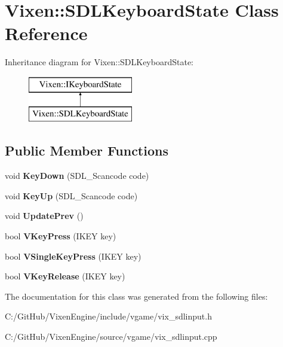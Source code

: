 \hypertarget{class_vixen_1_1_s_d_l_keyboard_state}{}\section{Vixen\+:\+:S\+D\+L\+Keyboard\+State Class Reference}
\label{class_vixen_1_1_s_d_l_keyboard_state}
Inheritance diagram for Vixen\+:\+:S\+D\+L\+Keyboard\+State\+:\begin{figure}[H]
\begin{center}
\leavevmode
\includegraphics[height=2.000000cm]{class_vixen_1_1_s_d_l_keyboard_state}
\end{center}
\end{figure}
\subsection*{Public Member Functions}
\begin{DoxyCompactItemize}
\item 
\hypertarget{class_vixen_1_1_s_d_l_keyboard_state_a21a6e4ff37104cf887b544ba4248c2f7}{}void {\bfseries Key\+Down} (S\+D\+L\+\_\+\+Scancode code)\label{class_vixen_1_1_s_d_l_keyboard_state_a21a6e4ff37104cf887b544ba4248c2f7}

\item 
\hypertarget{class_vixen_1_1_s_d_l_keyboard_state_a366de412e538b66108a47c7e3ac21499}{}void {\bfseries Key\+Up} (S\+D\+L\+\_\+\+Scancode code)\label{class_vixen_1_1_s_d_l_keyboard_state_a366de412e538b66108a47c7e3ac21499}

\item 
\hypertarget{class_vixen_1_1_s_d_l_keyboard_state_a26ec49385ba392b06a79db1007d1a5d3}{}void {\bfseries Update\+Prev} ()\label{class_vixen_1_1_s_d_l_keyboard_state_a26ec49385ba392b06a79db1007d1a5d3}

\item 
\hypertarget{class_vixen_1_1_s_d_l_keyboard_state_ab17b53b437a8f4f84f69464fd4c1ae09}{}bool {\bfseries V\+Key\+Press} (I\+K\+E\+Y key)\label{class_vixen_1_1_s_d_l_keyboard_state_ab17b53b437a8f4f84f69464fd4c1ae09}

\item 
\hypertarget{class_vixen_1_1_s_d_l_keyboard_state_a06221c26bc348c0b108443f1ea8f5866}{}bool {\bfseries V\+Single\+Key\+Press} (I\+K\+E\+Y key)\label{class_vixen_1_1_s_d_l_keyboard_state_a06221c26bc348c0b108443f1ea8f5866}

\item 
\hypertarget{class_vixen_1_1_s_d_l_keyboard_state_aceafe57e79fbf820c3f88f7ec70b870f}{}bool {\bfseries V\+Key\+Release} (I\+K\+E\+Y key)\label{class_vixen_1_1_s_d_l_keyboard_state_aceafe57e79fbf820c3f88f7ec70b870f}

\end{DoxyCompactItemize}


The documentation for this class was generated from the following files\+:\begin{DoxyCompactItemize}
\item 
C\+:/\+Git\+Hub/\+Vixen\+Engine/include/vgame/vix\+\_\+sdlinput.\+h\item 
C\+:/\+Git\+Hub/\+Vixen\+Engine/source/vgame/vix\+\_\+sdlinput.\+cpp\end{DoxyCompactItemize}
